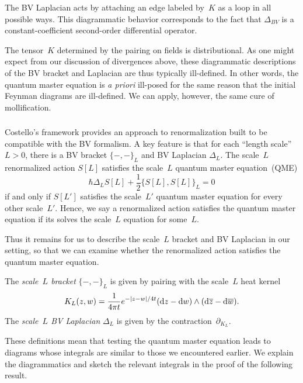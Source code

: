 The BV Laplacian acts by attaching an edge labeled by~$K$ as a loop in all possible ways.
This diagrammatic behavior corresponds to the fact that $\Delta_{BV}$ is a constant-coefficient second-order differential operator.

The tensor~$K$ determined by the pairing on fields is distributional.
As one might expect from our discussion of divergences above,
these diagrammatic descriptions of the BV bracket and Laplacian are thus typically ill-defined.
In other words, the quantum master equation is {\em a priori} ill-posed for the same reason that the initial Feynman diagrams are ill-defined.
We can apply, however, the same cure of mollification.

\subsubsection{}

Costello's framework \cite{CosBook} provides an approach to renormalization built to be compatible with the BV formalism.
A key feature is that for each ``length scale''~$L>0$, 
there is a BV bracket $\{-,-\}_L$ and BV Laplacian $\Delta_L$.
The scale~$L$ renormalized action $S[L]$ satisfies the scale~$L$ quantum master equation~(QME)
\[
\hbar \Delta_{L} S[L] + \frac{1}{2}\{S[L],S[L]\}_L = 0
\]
if and only if $S[L']$ satisfies the scale~$L'$ quantum master equation for every other scale~$L'$.
Hence, we say a renormalized action satisfies the quantum master equation if its solves the scale~$L$ equation for some~$L$.

Thus it remains for us to describe the scale~$L$ bracket and BV Laplacian in our setting,
so that we can examine whether the renormalized action satisfies the quantum master equation.

\begin{dfn}
The {\em scale~$L$ bracket} $\{-,-\}_L$ is given by pairing with the scale~$L$ heat kernel
\[
K_L(z,w) = \frac{1}{4\pi t} e^{-|z-w|/4t} ({\rm d} z - {\rm d} w) \wedge ({\rm d}\overline{z} - {\rm d}\overline{w}). 
\]
The {\em scale~$L$ BV Laplacian} $\Delta_L$ is given by the contraction~$\partial_{K_L}$.
\end{dfn}

These definitions mean that testing the quantum master equation leads to diagrams whose integrals are similar to those we encountered earlier.
We explain the diagrammatics and sketch the relevant integrals in the proof of the following result.

\begin{prop}
\end{prop}

